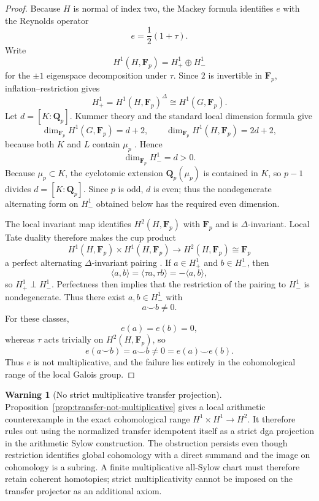 \documentclass[11pt]{article}
\theoremstyle{definition}
\newtheorem{warning}[theorem]{Warning}
\newcommand{\Qp}{\mathbf Q_p}
\begin{document}
\begin{proof}
Because $H$ is normal of index two, the Mackey formula identifies $e$ with the Reynolds operator
\[
 e=\frac12(1+\tau).
\]
Write
\[
 H^1(H,\mathbf F_p)=H^1_+\oplus H^1_-
\]
for the $\pm1$ eigenspace decomposition under $\tau$.  Since $2$ is invertible in $\mathbf F_p$, inflation--restriction gives
\[
 H^1_+=H^1(H,\mathbf F_p)^\Delta
 \cong H^1(G,\mathbf F_p).
\]
Let $d=[K:\Qp]$.  Kummer theory and the standard local dimension formula give
\[
 \dim_{\mathbf F_p}H^1(G,\mathbf F_p)=d+2,
 \qquad
 \dim_{\mathbf F_p}H^1(H,\mathbf F_p)=2d+2,
\]
because both $K$ and $L$ contain $\mu_p$ \cite{NSW}.  Hence
\[
 \dim_{\mathbf F_p}H^1_-=d>0.
\]
Because $\mu_p\subset K$, the cyclotomic extension $\Qp(\mu_p)$ is contained in $K$, so $p-1$ divides $d=[K:\Qp]$.  Since $p$ is odd, $d$ is even; thus the nondegenerate alternating form on $H^1_-$ obtained below has the required even dimension.

The local invariant map identifies $H^2(H,\mathbf F_p)$ with $\mathbf F_p$ and is $\Delta$-invariant.  Local Tate duality therefore makes the cup product
\[
 H^1(H,\mathbf F_p)\times H^1(H,\mathbf F_p)
 \longrightarrow H^2(H,\mathbf F_p)\cong\mathbf F_p
\]
a perfect alternating $\Delta$-invariant pairing \cite{NSW}.  If
$a\in H^1_+$ and $b\in H^1_-$, then
\[
 \langle a,b\rangle
 =\langle\tau a,\tau b\rangle
 =-\langle a,b\rangle,
\]
so $H^1_+\perp H^1_-$.  Perfectness then implies that the restriction of the pairing to $H^1_-$ is nondegenerate.  Thus there exist
$a,b\in H^1_-$ with
\[
 a\smile b\ne0.
\]
For these classes,
\[
 e(a)=e(b)=0,
\]
whereas $\tau$ acts trivially on $H^2(H,\mathbf F_p)$, so
\[
 e(a\smile b)=a\smile b\ne0=e(a)\smile e(b).
\]
Thus $e$ is not multiplicative, and the failure lies entirely in the cohomological range of the local Galois group.
\end{proof}

\begin{warning}[No strict multiplicative transfer projection]\label{warn:no-strict-multiplicative-transfer}
Proposition~\ref{prop:transfer-not-multiplicative} gives a local arithmetic counterexample in the exact cohomological range $H^1\times H^1\to H^2$.  It therefore rules out using the normalized transfer idempotent itself as a strict dga projection in the arithmetic Sylow construction.  The obstruction persists even though restriction identifies global cohomology with a direct summand and the image on cohomology is a subring.  A finite multiplicative all-Sylow chart must therefore retain coherent homotopies; strict multiplicativity cannot be imposed on the transfer projector as an additional axiom.
\end{warning}
\end{document}
